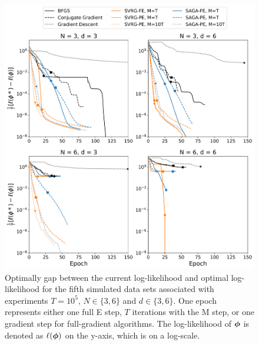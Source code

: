 \documentclass[12pt]{article}
\begin{document}
\begin{figure}[H]
    \centering
    \includegraphics[width=6.5in]{../plt/log-like_v_epoch_T-100000-004.png}
    \caption{Optimally gap between the current log-likelihood and optimal log-likelihood for the fifth simulated data sets associated with experiments $T=10^{5}$, $N \in \{3,6\}$ and $d \in \{3,6\}$. One epoch represents either one full E step, $T$ iterations with the M step, or one gradient step for full-gradient algorithms. The log-likelihood of $\boldsymbol{\phi}$ is denoted as $\ell(\boldsymbol{\phi})$ on the y-axis, which is on a log-scale.}
\end{figure}
\end{document}
